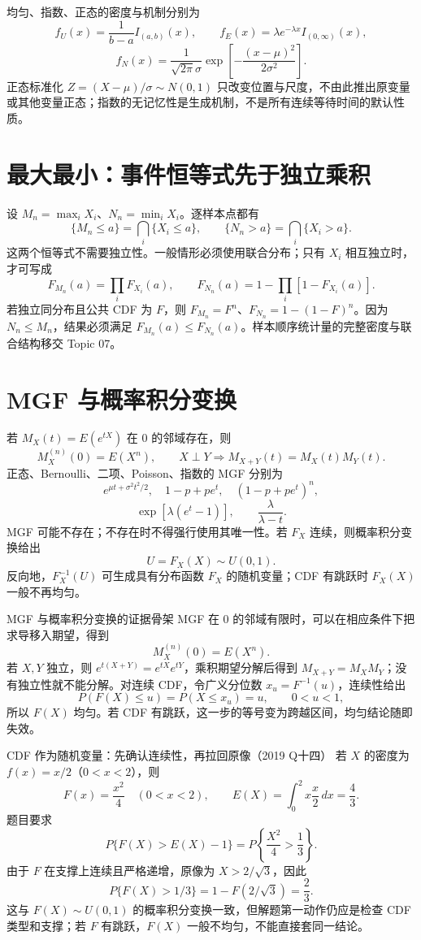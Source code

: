 \documentclass[11pt,a4paper]{ctexart}
\begin{document}
均匀、指数、正态的密度与机制分别为
\[
f_U(x)=\frac1{b-a}I_{(a,b)}(x),\qquad
f_E(x)=\lambda e^{-\lambda x}I_{(0,\infty)}(x),
\]
\[
f_N(x)=\frac1{\sqrt{2\pi}\sigma}\exp\left[-\frac{(x-\mu)^2}{2\sigma^2}\right].
\]
正态标准化 $Z=(X-\mu)/\sigma\sim N(0,1)$ 只改变位置与尺度，不由此推出原变量或其他变量正态；指数的无记忆性是生成机制，不是所有连续等待时间的默认性质。

\section{最大最小：事件恒等式先于独立乘积}

设 $M_n=\max_iX_i$、$N_n=\min_iX_i$。逐样本点都有
\[
\{M_n\le a\}=\bigcap_i\{X_i\le a\},\qquad
\{N_n>a\}=\bigcap_i\{X_i>a\}.
\]
这两个恒等式不需要独立性。一般情形必须使用联合分布；只有 $X_i$ 相互独立时，才可写成
\[
F_{M_n}(a)=\prod_iF_{X_i}(a),\qquad
F_{N_n}(a)=1-\prod_i[1-F_{X_i}(a)].
\]
若独立同分布且公共 CDF 为 $F$，则 $F_{M_n}=F^n$、$F_{N_n}=1-(1-F)^n$。因为 $N_n\le M_n$，结果必须满足 $F_{M_n}(a)\le F_{N_n}(a)$。样本顺序统计量的完整密度与联合结构移交 Topic 07。

\section{MGF 与概率积分变换}

若 $M_X(t)=E(e^{tX})$ 在 $0$ 的邻域存在，则
\[
M_X^{(n)}(0)=E(X^n),\qquad X\perp Y\Longrightarrow M_{X+Y}(t)=M_X(t)M_Y(t).
\]
正态、Bernoulli、二项、Poisson、指数的 MGF 分别为
\[
e^{\mu t+\sigma^2t^2/2},\quad 1-p+pe^t,\quad (1-p+pe^t)^n,
\]
\[
\exp[\lambda(e^t-1)],\qquad \frac{\lambda}{\lambda-t}.
\]
MGF 可能不存在；不存在时不得强行使用其唯一性。若 $F_X$ 连续，则概率积分变换给出
\[
\boxed{U=F_X(X)\sim U(0,1)}.
\]
反向地，$F_X^{-1}(U)$ 可生成具有分布函数 $F_X$ 的随机变量；CDF 有跳跃时 $F_X(X)$ 一般不再均匀。

\begin{methodbox}{MGF 与概率积分变换的证据骨架}
MGF 在 $0$ 的邻域有限时，可以在相应条件下把求导移入期望，得到
\[
M_X^{(n)}(0)=E(X^n).
\]
若 $X,Y$ 独立，则 $e^{t(X+Y)}=e^{tX}e^{tY}$，乘积期望分解后得到 $M_{X+Y}=M_XM_Y$；没有独立性就不能分解。对连续 CDF，令广义分位数 $x_u=F^{-1}(u)$，连续性给出
\[
P(F(X)\le u)=P(X\le x_u)=u,\qquad0<u<1,
\]
所以 $F(X)$ 均匀。若 CDF 有跳跃，这一步的等号变为跨越区间，均匀结论随即失效。
\end{methodbox}

\begin{examplebox}{CDF 作为随机变量：先确认连续性，再拉回原像（2019 Q十四）}
若 $X$ 的密度为 $f(x)=x/2$（$0<x<2$），则
\[
F(x)=\frac{x^2}{4}\quad(0<x<2),\qquad E(X)=\int_0^2x\frac{x}{2}\,dx=\frac43.
\]
题目要求
\[
P\{F(X)>E(X)-1\}=P\left\{\frac{X^2}{4}>\frac13\right\}.
\]
由于 $F$ 在支撑上连续且严格递增，原像为 $X>2/\sqrt3$，因此
\[
P\{F(X)>1/3\}=1-F(2/\sqrt3)=\frac23.
\]
这与 $F(X)\sim U(0,1)$ 的概率积分变换一致，但解题第一动作仍应是检查 CDF 类型和支撑；若 $F$ 有跳跃，$F(X)$ 一般不均匀，不能直接套同一结论。
\end{examplebox}
\end{document}

